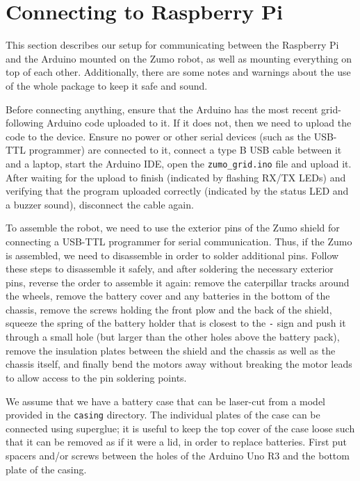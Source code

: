 \documentclass{article}
\begin{document}
\section{Connecting to Raspberry Pi}

This section describes our setup for communicating between the Raspberry Pi and 
the Arduino mounted on the Zumo robot, as well as mounting everything on top of 
each other. Additionally, there are some notes and warnings about the use of 
the whole package to keep it safe and sound.

Before connecting anything, ensure that the Arduino has the most recent 
grid-following Arduino code uploaded to it. If it does not, then we need to 
upload the code to the device. Ensure no power or other serial devices (such as 
the USB-TTL programmer) are connected to it, connect a type B USB cable between 
it and a laptop, start the Arduino IDE, open the {\tt zumo\_grid.ino} file and 
upload it. After waiting for the upload to finish (indicated by flashing RX/TX 
LEDs) and verifying that the program uploaded correctly (indicated by the 
status LED and a buzzer sound), disconnect the cable again.

To assemble the robot, we need to use the exterior pins of the Zumo shield for 
connecting a USB-TTL programmer for serial communication. Thus, if the Zumo is 
assembled, we need to disassemble in order to solder additional pins. Follow 
these steps to disassemble it safely, and after soldering the necessary 
exterior pins, reverse the order to assemble it again: remove the caterpillar 
tracks around the wheels, remove the battery cover and any batteries in the 
bottom of the chassis, remove the screws holding the front plow and the back of 
the shield, squeeze the spring of the battery holder that is closest to the 
{\tt -} sign and push it through a small hole (but larger than the other holes 
above the battery pack), remove the insulation plates between the shield and 
the chassis as well as the chassis itself, and finally bend the motors away 
without breaking the motor leads to allow access to the pin soldering points.

We assume that we have a battery case that can be laser-cut from a model 
provided in the {\tt casing} directory. The individual plates of the case can 
be connected using superglue; it is useful to keep the top cover of the case 
loose such that it can be removed as if it were a lid, in order to replace 
batteries. First put spacers and/or screws between the holes of the Arduino Uno 
R3 and the bottom plate of the casing.
\end{document}
